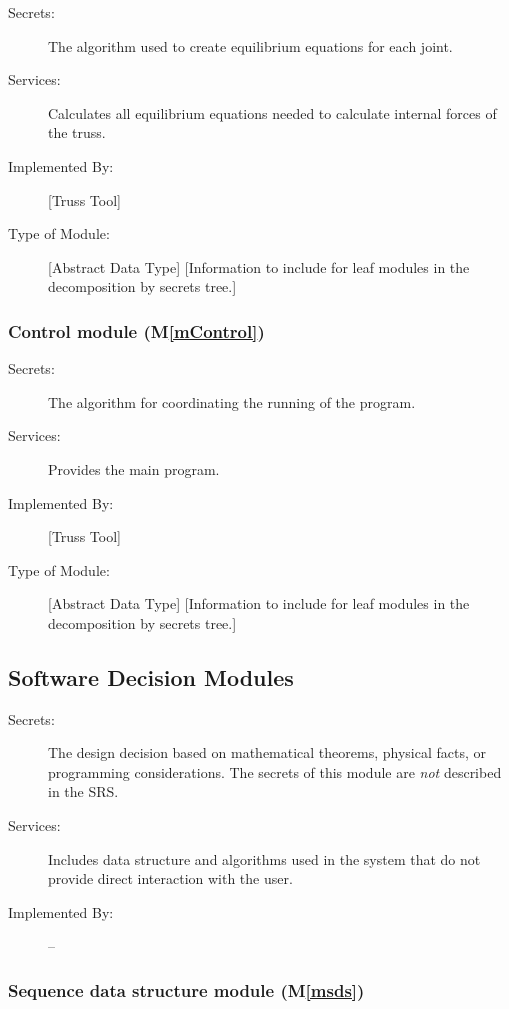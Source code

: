 \documentclass[12pt, titlepage]{article}
\newcommand{\mref}[1]{M\ref{#1}}
\begin{document}
\begin{description}
\item[Secrets:]The algorithm used to create equilibrium equations for each joint.
\item[Services:] Calculates all equilibrium equations needed to calculate internal forces of the truss. 
\item[Implemented By:] [Truss Tool]
\item[Type of Module:] [Abstract Data Type]
  [Information to include for leaf modules in the decomposition by secrets tree.]
\end{description}
\subsubsection{Control module (\mref{mControl})}

\begin{description}
\item[Secrets:]The algorithm for coordinating the running of the program.
\item[Services:] Provides the main program.
\item[Implemented By:] [Truss Tool]
\item[Type of Module:] [Abstract Data Type]
  [Information to include for leaf modules in the decomposition by secrets tree.]
\end{description}



\subsection{Software Decision Modules}

\begin{description}
\item[Secrets:] The design decision based on mathematical theorems, physical
  facts, or programming considerations. The secrets of this module are
  \emph{not} described in the SRS.
\item[Services:] Includes data structure and algorithms used in the system that
  do not provide direct interaction with the user. 
\item[Implemented By:] --
\end{description}
\subsubsection{Sequence data structure module (\mref{msds})}
\end{document}
